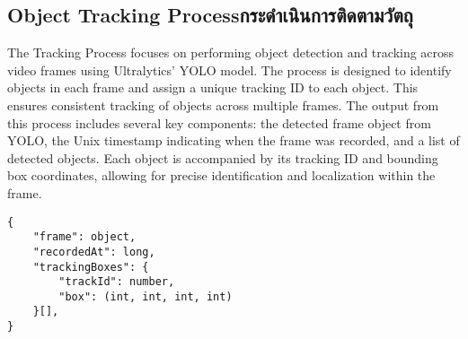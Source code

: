 \subsection{\ifenglish Object Tracking Process\else กระดำเนินการติดตามวัตถุ\fi}
The Tracking Process focuses on performing object detection and tracking across video frames using Ultralytics' YOLO model. The process is designed to identify objects in each frame and assign a unique tracking ID to each object. This ensures consistent tracking of objects across multiple frames. The output from this process includes several key components: the detected frame object from YOLO, the Unix timestamp indicating when the frame was recorded, and a list of detected objects. Each object is accompanied by its tracking ID and bounding box coordinates, allowing for precise identification and localization within the frame.
\begin{lstlisting}
{
    "frame": object,
    "recordedAt": long,
    "trackingBoxes": {
        "trackId": number, 
        "box": (int, int, int, int) 
    }[],
}
\end{lstlisting}